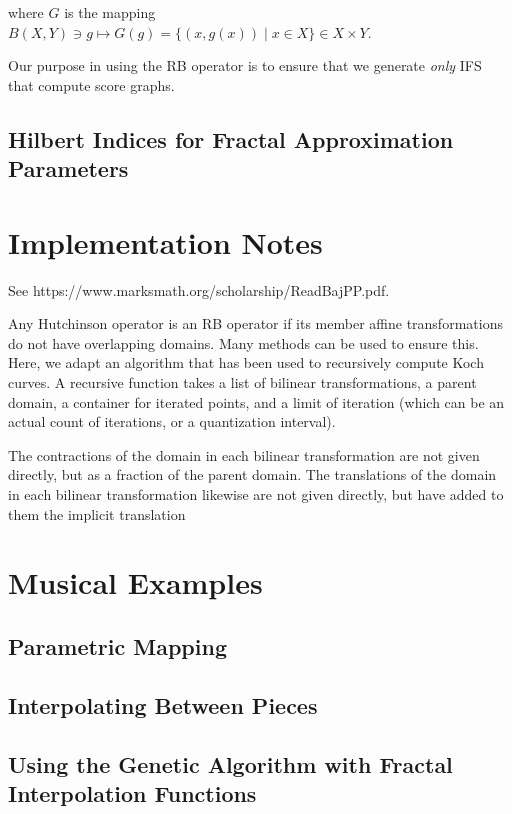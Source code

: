 \documentclass[english,11pt,letterpaper,onecolumn]{scrartcl}
\numberwithin{equation}{section}
\begin{document}
\noindent where $G$ is the mapping $B(X,Y)\ni g\longmapsto G(g) = \{(x, g(x))\mid x\in X\}\in X\times Y$.

Our purpose in using the RB operator is to ensure that we generate \textit{only} IFS
that compute score graphs.

\subsection{Hilbert Indices for Fractal Approximation Parameters}

\section{Implementation Notes}

See https://www.marksmath.org/scholarship/ReadBajPP.pdf.

Any Hutchinson operator is an RB operator if its member affine transformations do not have overlapping domains.
Many methods can be used to ensure this. Here, we adapt an algorithm that has been used to recursively compute
Koch curves. A recursive function takes a list of bilinear transformations, a parent domain, a container for
iterated points, and a limit of iteration (which can be an actual count of iterations, or a quantization interval).

The contractions of the domain in each bilinear transformation are not given directly, but as a fraction of the
parent domain. The translations of the domain in each bilinear transformation likewise are not given directly,
but have added to them the implicit translation

\section{Musical Examples}

\subsection{Parametric Mapping}


\subsection{Interpolating Between Pieces}


\subsection{Using the Genetic Algorithm with Fractal Interpolation
Functions}
\end{document}
